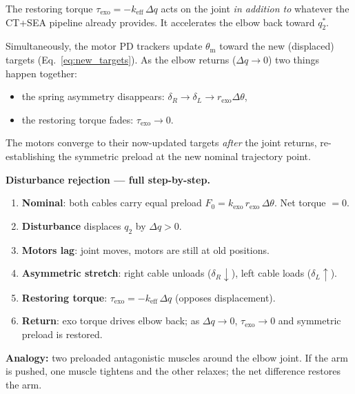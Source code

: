 \documentclass[11pt,a4paper]{article}
\begin{document}
The restoring torque $\tau_{\mathrm{exo}} = -k_{\mathrm{eff}}\,\Delta q$
acts on the joint \emph{in addition to} whatever the CT+SEA pipeline
already provides.  It accelerates the elbow back toward $q_2^{*}$.

Simultaneously, the motor PD trackers update $\theta_{\mathrm{m}}$ toward the
new (displaced) targets (Eq.~\ref{eq:new_targets}).  As the elbow returns
($\Delta q \to 0$) two things happen together:
\begin{itemize}[leftmargin=2em]
    \item the spring asymmetry disappears: $\delta_R \to \delta_L \to r_{\mathrm{exo}}\Delta\theta$,
    \item the restoring torque fades: $\tau_{\mathrm{exo}} \to 0$.
\end{itemize}

The motors converge to their now-updated targets \emph{after} the joint
returns, re-establishing the symmetric preload at the new nominal trajectory
point.

\begin{resultbox}
\textbf{Disturbance rejection --- full step-by-step.}
\begin{enumerate}[leftmargin=2em, itemsep=2pt]
    \item \textbf{Nominal}: both cables carry equal preload
          $F_0 = k_{\mathrm{exo}}\,r_{\mathrm{exo}}\,\Delta\theta$.
          Net torque $= 0$.
    \item \textbf{Disturbance} displaces $q_2$ by $\Delta q > 0$.
    \item \textbf{Motors lag}: joint moves, motors are still at old positions.
    \item \textbf{Asymmetric stretch}: right cable unloads
          ($\delta_R \downarrow$), left cable loads ($\delta_L \uparrow$).
    \item \textbf{Restoring torque}:
          $\tau_{\mathrm{exo}} = -k_{\mathrm{eff}}\,\Delta q$ (opposes displacement).
    \item \textbf{Return}: exo torque drives elbow back; as $\Delta q \to 0$,
          $\tau_{\mathrm{exo}} \to 0$ and symmetric preload is restored.
\end{enumerate}
\textbf{Analogy:} two preloaded antagonistic muscles around the elbow joint.
If the arm is pushed, one muscle tightens and the other relaxes; the net
difference restores the arm.
\end{resultbox}
\end{document}
